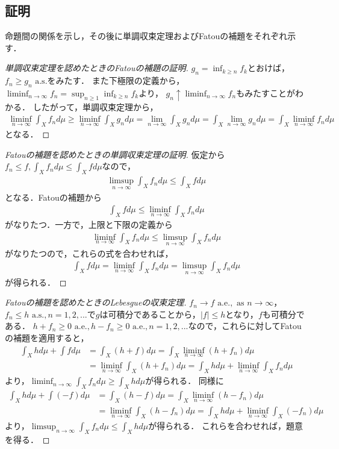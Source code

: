\documentclass[a4paper,10pt]{jsarticle}
\theoremstyle{definition}
\newcommand{\eq}[1]{\begin{align}#1\end{align}}
\begin{document}
\subsection*{証明}
命題間の関係を示し，その後に単調収束定理およびFatouの補題をそれぞれ示す．
\begin{proof}[単調収束定理を認めたときのFatouの補題の証明]
$g_n=\inf_{k\ge n}f_k$とおけば，$f_n\ge g_n\text{ a.s.}$をみたす．
また下極限の定義から，$\liminf_{n\rightarrow\infty}f_n=\sup_{n\ge1}\inf_{k\ge n}f_k$より，
$g_n\uparrow\liminf_{n\rightarrow\infty}f_n$もみたすことがわかる．
したがって，単調収束定理から，
\eq{
	\liminf_{n\rightarrow\infty}\int_Xf_nd\mu\ge\liminf_{n\rightarrow\infty}\int_Xg_nd\mu=\lim_{n\rightarrow\infty}\int_Xg_nd\mu
	=\int_X\lim_{n\rightarrow\infty}g_nd\mu=\int_X\liminf_{n\rightarrow\infty}f_nd\mu}
となる．
\end{proof}
\begin{proof}[Fatouの補題を認めたときの単調収束定理の証明]
仮定から$f_n\le f,\int_Xf_nd\mu\le\int_Xfd\mu$なので，
\eq{\limsup_{n\rightarrow\infty}\int_Xf_nd\mu\le\int_Xfd\mu}
となる．Fatouの補題から
\eq{\int_Xfd\mu\le\liminf_{n\rightarrow\infty}\int_Xf_nd\mu}
がなりたつ．一方で，上限と下限の定義から
\eq{\liminf_{n\rightarrow\infty}\int_Xf_nd\mu\le\limsup_{n\rightarrow\infty}\int_Xf_nd\mu}
がなりたつので，これらの式を合わせれば，
\eq{\int_Xfd\mu=\liminf_{n\rightarrow\infty}\int_Xf_nd\mu=\limsup_{n\rightarrow\infty}\int_Xf_nd\mu}
が得られる．
\end{proof}
\begin{proof}[Fatouの補題を認めたときのLebesgueの収束定理]
$f_n\rightarrow f\text{ a.e.},\text{ as }n\rightarrow\infty$，$f_n\le h\text{ a.s.},n=1,2,...$で$g$は可積分であることから，$|f|\le h$となり，$f$も可積分である．
$h+f_n\ge0\text{ a.e.},h-f_n\ge0\text{ a.e.},n=1,2,...$なので，これらに対してFatouの補題を適用すると，
\eq{	\int_Xhd\mu+\int fd\mu&=\int_X(h+f)d\mu=\int_X\liminf_{n\rightarrow\infty}(h+f_n)d\mu\\&=\liminf_{n\rightarrow\infty}\int_X(h+f_n)d\mu=\int_Xhd\mu+\liminf_{n\rightarrow\infty}\int_Xf_nd\mu}
より，$\liminf_{n\rightarrow\infty}\int_Xf_nd\mu\ge\int_Xhd\mu$が得られる．
同様に
\eq{	\int_Xhd\mu+\int(-f)d\mu&=\int_X(h-f)d\mu=\int_X\liminf_{n\rightarrow\infty}(h-f_n)d\mu\\&=\liminf_{n\rightarrow\infty}\int_X(h-f_n)d\mu=\int_Xhd\mu+\liminf_{n\rightarrow\infty}\int_X(-f_n)d\mu}
より，$\limsup_{n\rightarrow\infty}\int_Xf_nd\mu\le\int_Xhd\mu$が得られる．
これらを合わせれば，題意を得る．
\end{proof}
\end{document}

